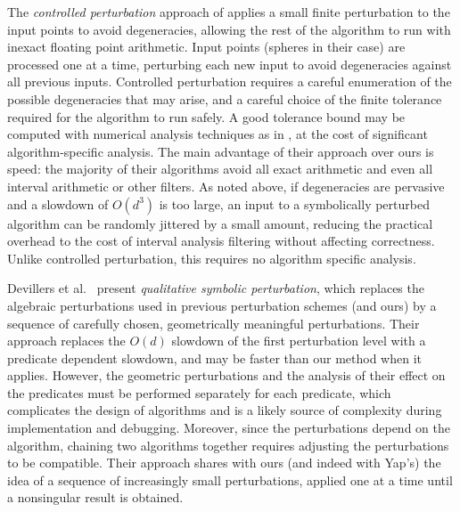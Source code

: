 \documentclass[11pt]{article}
\begin{document}
The \emph{controlled perturbation} approach of \cite{halperin1998perturbation} applies a small finite perturbation to the input points to avoid degeneracies, allowing the rest
of the algorithm to run with inexact floating point arithmetic.  Input points (spheres in their case) are processed one at a time, perturbing each new input to avoid degeneracies
against all previous inputs.  Controlled perturbation requires a careful enumeration of the possible degeneracies that may arise, and a careful choice of the finite tolerance
required for the algorithm to run safely.  A good tolerance bound may be computed with numerical analysis techniques as in \cite{halperin2004controlled}, at the cost of significant
algorithm-specific analysis.  The main advantage of their approach over ours is speed: the majority of their algorithms avoid all exact arithmetic and even all interval arithmetic
or other filters.  As noted above, if degeneracies are pervasive and a slowdown of $O(d^3)$ is too large, an input to a symbolically perturbed algorithm can be randomly
jittered by a small amount, reducing the practical overhead to the cost of interval analysis filtering without affecting correctness.  Unlike controlled perturbation, this requires
no algorithm specific analysis. 

Devillers et al.\ \cite{devillers2012qualitative} present \emph{qualitative symbolic perturbation}, which replaces the algebraic perturbations used in previous perturbation schemes (and ours)
by a sequence of carefully chosen, geometrically meaningful perturbations.  Their approach replaces the $O(d)$ slowdown of the first perturbation level with a predicate dependent
slowdown, and may be faster than our method when it applies.  However, the geometric perturbations and the analysis of their effect on the predicates must be performed separately for each
predicate, which complicates the design of algorithms and is a likely source of complexity during implementation and debugging.  Moreover, since the perturbations depend on the
algorithm, chaining two algorithms together requires adjusting the perturbations to be compatible.  Their approach shares with ours (and indeed
with Yap's) the idea of a sequence of increasingly small perturbations, applied one at a time until a nonsingular result is obtained.
\end{document}
